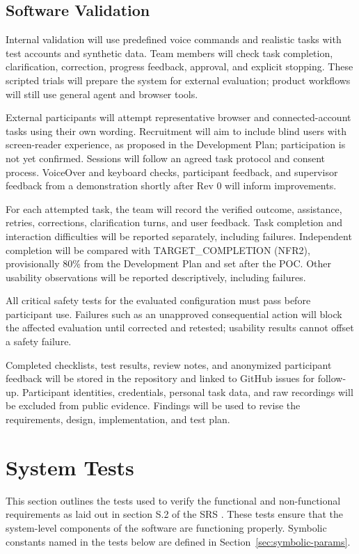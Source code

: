 \documentclass[12pt, titlepage]{article}
\begin{document}
\subsection{Software Validation}

Internal validation will use predefined voice commands and realistic tasks with
test accounts and synthetic data. Team members will check task completion,
clarification, correction, progress feedback, approval, and explicit stopping.
These scripted trials will prepare the system for external evaluation; product
workflows will still use general agent and browser tools.

External participants will attempt representative browser and connected-account
tasks using their own wording. Recruitment will aim to include blind users with
screen-reader experience, as proposed in the Development Plan; participation
is not yet confirmed. Sessions will follow an agreed task protocol and consent
process. VoiceOver and keyboard checks, participant feedback, and supervisor
feedback from a demonstration shortly after Rev 0 will inform improvements.

For each attempted task, the team will record the verified outcome, assistance,
retries, corrections, clarification turns, and user feedback. Task completion
and interaction difficulties will be reported separately, including failures.
Independent completion will be compared with TARGET\_COMPLETION (NFR2),
provisionally 80\% from the Development Plan and set after the POC. Other
usability observations will be reported descriptively, including failures.

All critical safety tests for the evaluated configuration must pass before
participant use. Failures such as an unapproved consequential action will block
the affected evaluation until corrected and retested; usability results cannot
offset a safety failure.

Completed checklists, test results, review notes, and anonymized participant
feedback will be stored in the repository and linked to GitHub issues for
follow-up. Participant identities, credentials, personal task data, and raw
recordings will be excluded from public evidence. Findings will be used to
revise the requirements, design, implementation, and test plan.

\section{System Tests}

This section outlines the tests used to verify the functional and non-functional requirements as laid
out in section S.2 of the SRS \citep{SRS}. These tests ensure that the system-level components of the
software are functioning properly. Symbolic constants named in the tests below are defined in
Section~\ref{sec:symbolic-params}.
\end{document}
